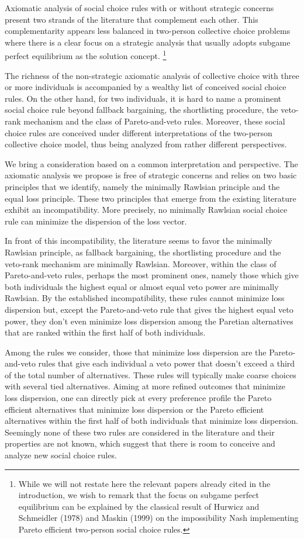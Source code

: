 \documentclass[version=3.21, pagesize, twoside=off, bibliography=totoc, DIV=calc, fontsize=12pt, a4paper]{scrartcl}
\begin{document}
Axiomatic analysis of social choice rules with or without strategic concerns present two strands of the literature that complement each other. This complementarity appears less balanced in two-person collective choice problems where there is a clear focus on a strategic analysis that usually adopts subgame perfect equilibrium as the solution concept. \footnote{While we will not restate here the relevant papers already cited in the introduction, we wish to remark that the focus on subgame perfect equilibrium can be explained by the classical result of Hurwicz and Schmeidler (1978) and Maskin (1999) on the impossibility Nash implementing Pareto efficient two-person social choice rules.} 

The richness of the non-strategic axiomatic analysis of collective choice with three or more individuals is accompanied by a wealthy list of conceived social choice rules. On the other hand, for two individuals, it is hard to name a prominent social choice rule beyond fallback bargaining, the shortlisting procedure, the veto-rank mechanism and the class of Pareto-and-veto rules. Moreover, these social choice rules are conceived under different interpretations of the two-person collective choice model, thus being analyzed from rather different perspectives.

We bring a consideration based on a common interpretation and perspective. The axiomatic analysis we propose is free of strategic concerns and relies on two basic principles that we identify, namely the minimally Rawlsian principle and the equal loss principle. These two principles that emerge from the existing literature exhibit an incompatibility. More precisely, no minimally Rawlsian social choice rule can minimize the dispersion of the loss vector.

In front of this incompatibility, the literature seems to favor the minimally Rawlsian principle, as fallback bargaining, the shortlisting procedure and the veto-rank mechanism are minimally Rawlsian. Moreover, within the class of Pareto-and-veto rules, perhaps the most prominent ones, namely those which give both individuals the highest equal or almost equal veto power are minimally Rawlsian. By the established incompatibility, these rules cannot minimize loss dispersion but, except the Pareto-and-veto rule that gives the highest equal veto power, they don’t even minimize loss dispersion among the Paretian alternatives that are ranked within the first half of both individuals.

Among the rules we consider, those that minimize loss dispersion are the Pareto-and-veto rules that give each individual a veto power that doesn't exceed a third of the total number of alternatives. These rules will typically make coarse choices with several tied alternatives. Aiming at more refined outcomes that minimize loss dispersion, one can directly pick at every preference profile the Pareto efficient alternatives that minimize loss dispersion or the Pareto efficient alternatives within the first half of both individuals that minimize loss dispersion. Seemingly none of these two rules are considered in the literature and their properties are not known, which suggest that there is room to conceive and analyze new social choice rules.
\end{document}
